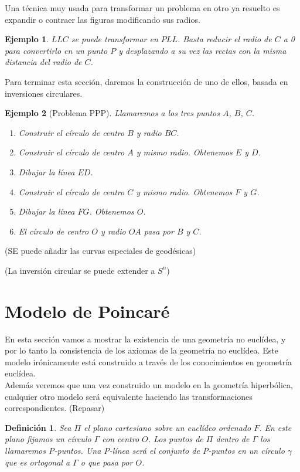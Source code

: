 \documentclass[a4paper]{amsart}
\theoremstyle{plain}
\newtheorem{definition}{Definición}
\newtheorem{example}{Ejemplo}
\begin{document}
Una técnica muy usada para transformar un problema en otro ya resuelto es expandir o contraer las figuras modificando sus radios. 

\begin{example}
$LLC$ se puede transformar en $PLL$. Basta reducir el radio de $C$ a 0 para convertirlo en un punto $P$ y desplazando a su vez las rectas con la misma distancia del radio de $C$.
\end{example}

Para terminar esta sección, daremos la construcción de uno de ellos, basada en inversiones circulares.

\begin{example}[Problema PPP]
Llamaremos a los tres puntos $A$, $B$, $C$.
\begin{enumerate}
\item [1.] Construir el círculo de centro $B$ y radio $BC$.
\item [2.] Construir el círculo de centro $A$ y mismo radio. Obtenemos $E$ y $D$.
\item [3.] Dibujar la línea $ED$.
\item [4.] Construir el círculo de centro $C$ y mismo radio. Obtenemos $F$ y $G$.
\item [5.] Dibujar la línea $FG$. Obtenemos $O$.
\item [6.] El círculo de centro $O$ y radio $OA$ pasa por $B$ y $C$.
\end{enumerate}
\end{example}

(SE puede añadir las curvas especiales de geodésicas)

(La inversión circular se puede extender a $S^n$)

\section{Modelo de Poincaré}

En esta sección vamos a mostrar la existencia de una geometría no euclídea, y por lo tanto la consistencia de los axiomas de la geometría no euclídea. Este modelo irónicamente está construido a través de los conocimientos en geometría euclídea.\\
Además veremos que una vez construido un modelo en la geometría hiperbólica, cualquier otro modelo será equivalente haciendo las transformaciones correspondientes. (Repasar)

\begin{definition}
Sea $\Pi$ el plano cartesiano sobre un  euclídeo ordenado $F$. En este plano fijamos un círculo $\Gamma$ con centro $O$. Los puntos de $\Pi$ dentro de $\Gamma$ los llamaremos P-\textit{puntos}. Una P-\textit{línea} será el conjunto de P-\textit{puntos} en un círculo $\gamma$ que es ortogonal a $\Gamma$ o que pasa por $O$.
\end{definition}
\end{document}
